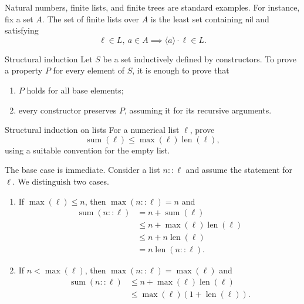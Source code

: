\documentclass[a4paper]{article}
\newcommand{\nil}{\mathsf{nil}}
\begin{document}
Natural numbers, finite lists, and finite trees are standard examples.
For instance, fix a set \(A\). The set of finite lists over \(A\) is the least set containing \(\nil\) and satisfying
\[
    \ell\in L,\ a\in A
    \implies
    \langle a\rangle\cdot \ell\in L.
\]

\begin{snippettheorem}{Structural induction}
    Let \(S\) be a set inductively defined by constructors.
    To prove a property \(P\) for every element of \(S\), it is enough to prove that
    \begin{enumerate}
        \item \(P\) holds for all base elements;
        \item every constructor preserves \(P\), assuming it for its recursive arguments.
    \end{enumerate}
\end{snippettheorem}

\begin{snippetexercise}{Structural induction on lists}
    For a numerical list \(\ell\), prove
    \[
        \operatorname{sum}(\ell)
        \leq
        \operatorname{max}(\ell)\operatorname{len}(\ell),
    \]
    using a suitable convention for the empty list.
\end{snippetexercise}

\begin{snippetsolution}{}
    The base case is immediate. Consider a list \(n::\ell\) and assume the statement for \(\ell\).
    We distinguish two cases.
    \begin{enumerate}
        \item If \(\max(\ell)\leq n\), then \(\max(n::\ell)=n\) and
        \begin{align*}
            \operatorname{sum}(n::\ell)
            &=n+\operatorname{sum}(\ell)\\
            &\leq n+\max(\ell)\operatorname{len}(\ell)\\
            &\leq n+n\operatorname{len}(\ell)\\
            &=n\operatorname{len}(n::\ell).
        \end{align*}
        \item If \(n<\max(\ell)\), then \(\max(n::\ell)=\max(\ell)\) and
        \begin{align*}
            \operatorname{sum}(n::\ell)
            &\leq n+\max(\ell)\operatorname{len}(\ell)\\
            &\leq \max(\ell)(1+\operatorname{len}(\ell)).
        \end{align*}
    \end{enumerate}
\end{snippetsolution}
\end{document}
